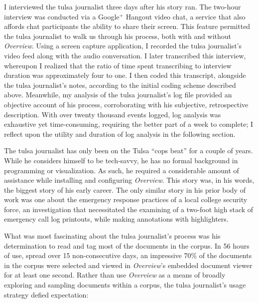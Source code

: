 I interviewed the {\sc tulsa} journalist three days after his story ran. 
The two-hour interview was conducted via a Google$^+$ Hangout video chat, a service that also affords chat participants the ability to share their screen. 
This feature permitted the {\sc tulsa} journalist to walk us through his process, both with and without {\it Overview}. 
Using a screen capture application, I recorded the {\sc tulsa} journalist's video feed along with the audio conversation. 
I later transcribed this interview, whereupon I realized that the ratio of time spent transcribing to interview duration was approximately four to one. 
I then coded this transcript, alongside the {\sc tulsa} journalist's notes, according to the initial coding scheme described above.
Meanwhile, my analysis of the {\sc tulsa} journalist's log file provided an objective account of his process, corroborating with his subjective, retrospective description.
With over twenty thousand events logged, log analysis was exhaustive yet time-consuming, requiring the better part of a week to complete; 
I reflect upon the utility and duration of log analysis in the following section.

The {\sc tulsa} journalist has only been on the Tulsa ``cops beat'' for a couple of years. 
While he considers himself to be tech-savvy, he has no formal background in programming or visualization. 
As such, he required a considerable amount of assistance while installing and configuring {\it Overview}. 
This story was, in his words, the biggest story of his early career. 
The only similar story in his prior body of work was one about the emergency response practices of a local college security force, an investigation that necessitated the examining of a two-foot high stack of emergency call log printouts, while making annotations with highlighters. 

What was most fascinating about the {\sc tulsa} journalist's process was his determination to read and tag most of the documents in the corpus. 
In 56 hours of use, spread over 15 non-consecutive days, an impressive 70\% of the documents in the corpus were selected and viewed in {\it Overview}'s embedded document viewer for at least one second. 
Rather than use {\it Overview} as a means of broadly exploring and sampling documents within a corpus, the {\sc tulsa} journalist's usage strategy defied expectation:

